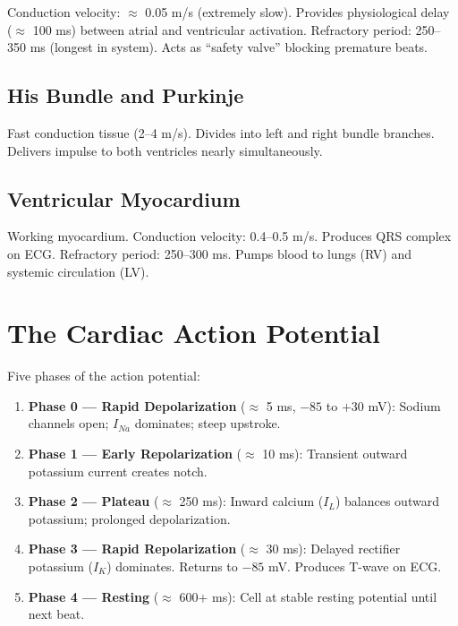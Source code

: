 \documentclass[12pt]{book}
\begin{document}
Conduction velocity: $\approx$ 0.05 m/s (extremely slow). Provides physiological delay ($\approx$ 100 ms) between atrial and ventricular activation. Refractory period: 250--350 ms (longest in system). Acts as ``safety valve'' blocking premature beats.

\subsection{His Bundle and Purkinje}

Fast conduction tissue (2--4 m/s). Divides into left and right bundle branches. Delivers impulse to both ventricles nearly simultaneously.

\subsection{Ventricular Myocardium}

Working myocardium. Conduction velocity: 0.4--0.5 m/s. Produces QRS complex on ECG. Refractory period: 250--300 ms. Pumps blood to lungs (RV) and systemic circulation (LV).

\section{The Cardiac Action Potential}

Five phases of the action potential:

\begin{enumerate}
  \item \textbf{Phase 0 — Rapid Depolarization} ($\approx$ 5 ms, $-85$ to $+30$ mV): Sodium channels open; $I_{Na}$ dominates; steep upstroke.
  
  \item \textbf{Phase 1 — Early Repolarization} ($\approx$ 10 ms): Transient outward potassium current creates notch.
  
  \item \textbf{Phase 2 — Plateau} ($\approx$ 250 ms): Inward calcium ($I_L$) balances outward potassium; prolonged depolarization.
  
  \item \textbf{Phase 3 — Rapid Repolarization} ($\approx$ 30 ms): Delayed rectifier potassium ($I_K$) dominates. Returns to $-85$ mV. Produces T-wave on ECG.
  
  \item \textbf{Phase 4 — Resting} ($\approx$ 600+ ms): Cell at stable resting potential until next beat.
\end{enumerate}
\end{document}
